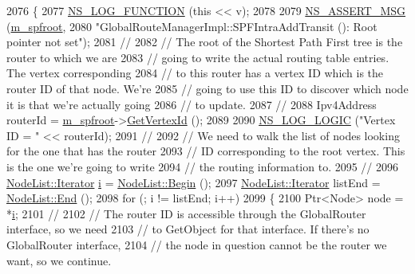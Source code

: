 \begin{DoxyCode}
2076 \{
2077   \hyperlink{log-macros-disabled_8h_a90b90d5bad1f39cb1b64923ea94c0761}{NS\_LOG\_FUNCTION} (\textcolor{keyword}{this} << v);
2078 
2079   \hyperlink{assert_8h_aff5ece9066c74e681e74999856f08539}{NS\_ASSERT\_MSG} (\hyperlink{classns3_1_1GlobalRouteManagerImpl_a977f6b62ef1f1b58d041a2f49c093a1c}{m\_spfroot}, 
2080                  \textcolor{stringliteral}{"GlobalRouteManagerImpl::SPFIntraAddTransit (): Root pointer not set"});
2081 \textcolor{comment}{//}
2082 \textcolor{comment}{// The root of the Shortest Path First tree is the router to which we are }
2083 \textcolor{comment}{// going to write the actual routing table entries.  The vertex corresponding}
2084 \textcolor{comment}{// to this router has a vertex ID which is the router ID of that node.  We're}
2085 \textcolor{comment}{// going to use this ID to discover which node it is that we're actually going}
2086 \textcolor{comment}{// to update.}
2087 \textcolor{comment}{//}
2088   Ipv4Address routerId = \hyperlink{classns3_1_1GlobalRouteManagerImpl_a977f6b62ef1f1b58d041a2f49c093a1c}{m\_spfroot}->\hyperlink{classns3_1_1SPFVertex_addc1067d86f26e9fe3b2e34ed16f929c}{GetVertexId} ();
2089 
2090   \hyperlink{group__logging_ga88acd260151caf2db9c0fc84997f45ce}{NS\_LOG\_LOGIC} (\textcolor{stringliteral}{"Vertex ID = "} << routerId);
2091 \textcolor{comment}{//}
2092 \textcolor{comment}{// We need to walk the list of nodes looking for the one that has the router}
2093 \textcolor{comment}{// ID corresponding to the root vertex.  This is the one we're going to write}
2094 \textcolor{comment}{// the routing information to.}
2095 \textcolor{comment}{//}
2096   \hyperlink{classns3_1_1NodeList_a9e2679a94efb4f0066cc21e65440364d}{NodeList::Iterator} \hyperlink{bernuolliDistribution_8m_a6f6ccfcf58b31cb6412107d9d5281426}{i} = \hyperlink{classns3_1_1NodeList_a93d2211831f5cb71d1dbb721e2721d7f}{NodeList::Begin} (); 
2097   \hyperlink{classns3_1_1NodeList_a9e2679a94efb4f0066cc21e65440364d}{NodeList::Iterator} listEnd = \hyperlink{classns3_1_1NodeList_a027a558c16e6078e25c7ffc67becb559}{NodeList::End} ();
2098   \textcolor{keywordflow}{for} (; i != listEnd; i++)
2099     \{
2100       Ptr<Node> node = *\hyperlink{bernuolliDistribution_8m_a6f6ccfcf58b31cb6412107d9d5281426}{i};
2101 \textcolor{comment}{//}
2102 \textcolor{comment}{// The router ID is accessible through the GlobalRouter interface, so we need}
2103 \textcolor{comment}{// to GetObject for that interface.  If there's no GlobalRouter interface, }
2104 \textcolor{comment}{// the node in question cannot be the router we want, so we continue.}

\end{DoxyCode}
